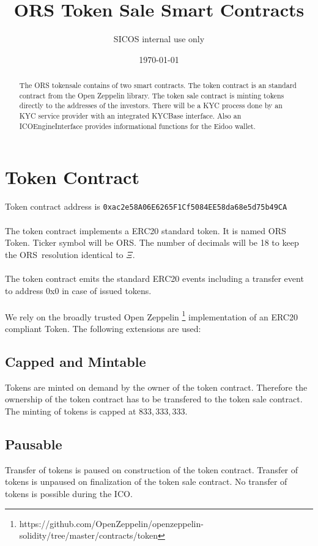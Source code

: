 \documentclass{article}
\newcommand{\ether}{$\Xi$}
\newcommand{\ors}{{\sf ORS}}
\newcommand{\orsT}{{\sf ORS Token}}
\begin{document}
\title{ORS Token Sale Smart Contracts}
\author{SICOS internal use only}
\date{\today}



\maketitle
 
 \begin{abstract}

 The ORS tokensale contains of two smart contracts. The token contract is an standard contract from the Open
 Zeppelin library. The token sale contract is minting tokens directly to the
 addresses of the investors. There will be a KYC process done by an KYC service
 provider with an integrated KYCBase interface. Also an ICOEngineInterface
 provides informational functions for the Eidoo wallet.
 \end{abstract}

\section{Token Contract}
Token contract address is {\tt 0xac2e58A06E6265F1Cf5084EE58da68e5d75b49CA}\\\\
The token contract implements a ERC20 standard token. It is named \orsT.
Ticker symbol will be \ors. The number of decimals will be 18 to keep the
\ors \ resolution  identical to \ether. \\\\
The token contract emits the standard ERC20 events including a transfer event to
address 0x0 in case of issued tokens.\\\\
We rely on the broadly trusted Open
Zeppelin \footnote{https://github.com/OpenZeppelin/openzeppelin-solidity/tree/master/contracts/token}
implementation of an ERC20 compliant Token. The following extensions are used:

\subsection{Capped and Mintable}
Tokens are minted on demand by the owner of the token contract. Therefore the
ownership of the token contract has to be transfered to the token sale contract. The minting of tokens is capped at
$833,333,333$.

\subsection{Pausable}
Transfer of tokens is paused on construction of the token contract. Transfer of
tokens is unpaused on finalization of the token sale contract. No transfer of
tokens is possible during the ICO.
\end{document}
